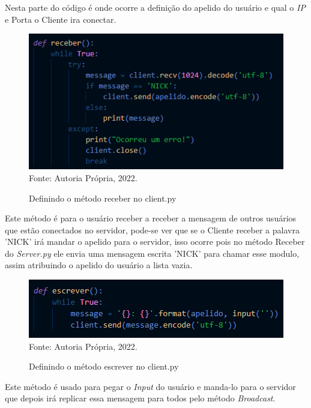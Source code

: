 \par Nesta parte do código é onde ocorre a definição do apelido do usuário e qual o \textit{IP} e Porta o Cliente ira conectar.
\newline

\begin{figure}[htbp]
	\centering
	\caption{Definindo o método receber no client.py}
	\includegraphics[]{PrintsServer/clientreceber.png}
	{\\Fonte: Autoria Própria, 2022.}
	\label{fig:criação_1}
\end{figure}

\par Este método é para o usuário receber a receber a mensagem de outros usuários que estão conectados no servidor, pode-se ver que se o Cliente receber a palavra 'NICK' irá mandar o apelido para o servidor, isso ocorre pois no método Receber do \textit{Server.py} ele envia uma mensagem escrita 'NICK' para chamar esse modulo, assim atribuindo o apelido do usuário a lista vazia.
\newline

\newpage\thispagestyle{empty}
\begin{figure}[htbp]
	\centering
	\caption{Definindo o método escrever no client.py}
	\includegraphics[]{PrintsServer/clientescrever.png}
	{\\Fonte: Autoria Própria, 2022.}
	\label{fig:criação_1}
\end{figure}

\par Este método é usado para pegar o \textit{Input} do usuário e manda-lo para o servidor que depois irá replicar essa mensagem para todos pelo método \textit{Broadcast}.
\newline

